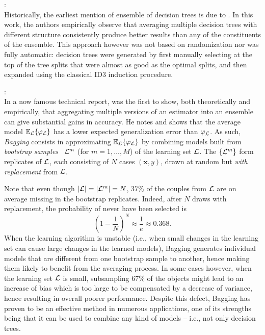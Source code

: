 \begin{description}

\item \citet{kwok:1990}: \hfill \\
    Historically, the earliest mention of ensemble of decision trees is due to
    \citet{kwok:1990}. In this work, the authors empirically observe that
    averaging multiple decision trees with different structure consistently
    produce better results than any of the constituents of the ensemble. This
    approach however was not based on randomization nor was fully automatic:
    decision trees were generated by first manually selecting at the top of the
    tree splits that were almost as good as the optimal splits, and then
    expanded using the classical ID3 induction procedure.

\item \citet{breiman:1996b}: \hfill \\
    In a now famous technical report, \citet{breiman:1996b} was the first to
    show, both theoretically and empirically, that aggregating multiple
    versions of an estimator into an ensemble can give substantial gains in
    accuracy. He notes and shows that the average model $\mathbb{E}_{\cal L}\{
    \varphi_{\cal L} \}$ has a lower expected generalization error than
    $\varphi_{\cal L}$. As such, \textit{Bagging}  consists in
    approximating $\mathbb{E}_{\cal L}\{ \varphi_{\cal L} \}$  by combining
    models built from \textit{bootstrap samples}~\citep{efron:1979} ${\cal
    L}^m$ (for $m=1,\dots,M$) of the learning set ${\cal L}$. The $\{ {\cal
    L}^m \}$ form replicates of ${\cal L}$, each consisting of $N$ cases $(\mathbf{x},y)$, drawn
    at random but \textit{with replacement} from ${\cal L}$.

    Note that even
    though $|{\cal L}|=|{\cal L}^m|=N$, $37\%$ of the couples from ${\cal L}$
    are on average missing in the bootstrap replicates. Indeed, after $N$ draws
    with replacement, the probability of never have been selected is
    \begin{equation}
    (1 - \frac{1}{N})^N \approx \frac{1}{e} \approx 0.368.
    \end{equation}
    When the learning algorithm is unstable (i.e., when small changes in the
    learning set can cause large changes in the learned models), Bagging
    generates individual models that are  different from one bootstrap sample
    to another, hence making them likely to benefit from the averaging process.
    In some cases however, when the learning set ${\cal L}$ is small,
    subsampling $67\%$ of the objects might lead to an increase of bias which
    is too large to be compensated by a decrease of variance, hence resulting
    in overall poorer performance. Despite this defect, Bagging has proven to
    be an effective method in numerous applications, one of its strengths being
    that it can be used to combine any kind of models -- i.e., not only
    decision trees.


\end{description}
